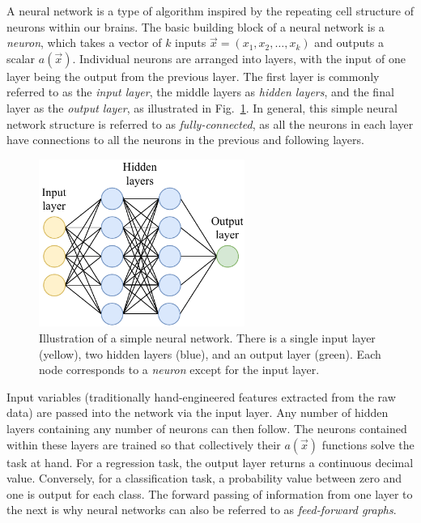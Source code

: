A neural network is a type of algorithm inspired by the repeating cell structure of neurons within
our brains. The basic building block of a neural network is a \emph{neuron}, which takes a vector
of $k$ inputs $\vec{x}=(x_{1}, x_{2},\dots,x_{k})$ and outputs a scalar $a(\vec{x})$. Individual
neurons are arranged into layers, with the input of one layer being the output from the previous
layer. The first layer is commonly referred to as the \emph{input layer}, the middle layers as
\emph{hidden layers}, and the final layer as the \emph{output layer}, as illustrated in
Fig.~\ref{fig:network}. In general, this simple neural network structure is referred to as
\emph{fully-connected}, as all the neurons in each layer have connections to all the neurons in
the previous and following layers.

\begin{figure} %
    \includegraphics[width=0.6\textwidth]{diagrams/6-cnn/network.pdf}
    \caption[Illustration of a simple neural network]
    {Illustration of a simple neural network. There is a single input layer (yellow), two hidden
        layers (blue), and an output layer (green). Each node corresponds to a \emph{neuron}
        except for the input layer.}
    \label{fig:network}
\end{figure}

Input variables (traditionally hand-engineered features extracted from the raw data) are passed
into the network via the input layer. Any number of hidden layers containing any number of neurons
can then follow. The neurons contained within these layers are trained so that collectively their
$a(\vec{x})$ functions solve the task at hand. For a regression task, the output layer returns a
continuous decimal value. Conversely, for a classification task, a probability value between zero
and one is output for each class. The forward passing of information from one layer to the next is
why neural networks can also be referred to as \emph{feed-forward graphs}.

